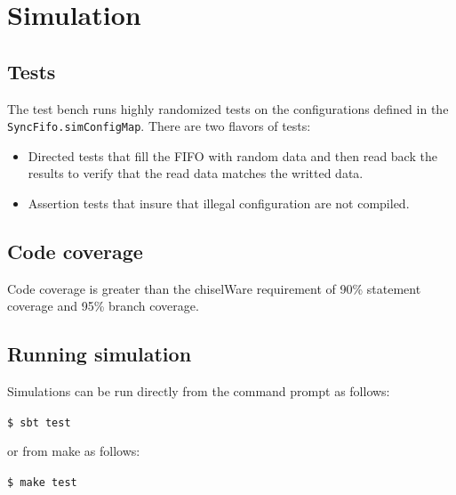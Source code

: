 \section{Simulation}

\subsection{Tests}
The test bench runs highly randomized tests on the configurations defined in the \texttt{SyncFifo.simConfigMap}. There are two flavors of tests:

\begin{itemize}
  \item {Directed tests that fill the FIFO with random data and then read back
        the results to verify that the read data matches the writted data.}
  \item {Assertion tests that insure that illegal configuration are not
        compiled.}
\end{itemize}

\subsection{Code coverage}

Code coverage is greater than the chiselWare requirement of 90\% statement
coverage and 95\% branch coverage.

\subsection{Running simulation}

Simulations can be run directly from the command prompt as follows:

\texttt{\$ sbt test}

or from make as follows:

\texttt{\$ make test}